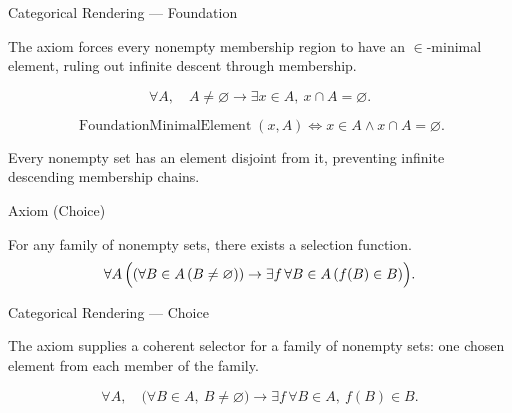 \begin{lracategoricalcard}{Categorical Rendering --- Foundation}
\begin{center}

\end{center}
\smallskip
\noindent\footnotesize
The axiom forces every nonempty membership region to have an
\(\in\)-minimal element, ruling out infinite descent through membership.
\end{lracategoricalcard}

\begin{remark*}
\[
  \forall A,\quad
  A\neq\varnothing \to \exists x\in A,\ x\cap A=\varnothing.
\]
\end{remark*}

\begin{remark*}
\[
  \operatorname{FoundationMinimalElement}(x,A)
  \iff
  x\in A\wedge x\cap A=\varnothing.
\]
\end{remark*}

\begin{remark*}[Interpretation]
Every nonempty set has an element disjoint from it, preventing infinite
descending membership chains.
\end{remark*}

\NoLocalDependencies

\begin{axiombox}{Axiom (Choice)}
\begin{axiom}
\label{ax:choice}
For any family of nonempty sets, there exists a selection function.
\[
\forall A \,
\Bigl(
(\forall B \in A \, (B \neq \varnothing))
\rightarrow
\exists f \,
\forall B \in A \, (f(B) \in B)
\Bigr).
\]
\end{axiom}
\end{axiombox}

\begin{lracategoricalcard}{Categorical Rendering --- Choice}
\begin{center}

\end{center}
\smallskip
\noindent\footnotesize
The axiom supplies a coherent selector for a family of nonempty sets: one
chosen element from each member of the family.
\end{lracategoricalcard}

\begin{remark*}
\[
  \forall A,\quad
  \bigl(\forall B\in A,\ B\neq\varnothing\bigr)
  \to
  \exists f\,\forall B\in A,\ f(B)\in B.
\]
\end{remark*}

